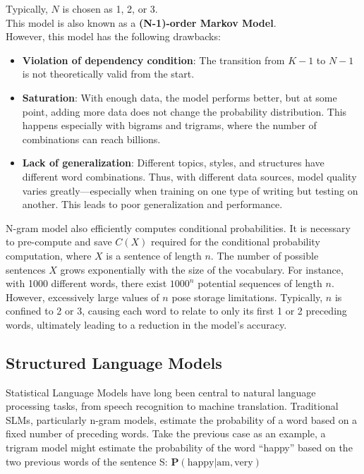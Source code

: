 Typically, $N$ is chosen as 1, 2, or 3.\\

This model is also known as a \textbf{(N-1)-order Markov Model}.\\

However, this model has the following drawbacks:

\begin{itemize}
    \item \textbf{Violation of dependency condition}: The transition from $K - 1$ to $N - 1$ is not theoretically valid from the start.
    \item \textbf{Saturation}: With enough data, the model performs better, but at some point, adding more data does not change the probability distribution. This happens especially with bigrams and trigrams, where the number of combinations can reach billions.
    \item \textbf{Lack of generalization}: Different topics, styles, and structures have different word combinations. Thus, with different data sources, model quality varies greatly—especially when training on one type of writing but testing on another. This leads to poor generalization and performance.
\end{itemize}

N-gram model also efficiently computes conditional probabilities. It is necessary to pre-compute and save $C(X)$ required for the conditional probability computation, where $X$ is a sentence of length $n$. The number of possible sentences $X$ grows exponentially with the size of the vocabulary. For instance, with 1000 different words, there exist $1000^n$ potential sequences of length $n$. However, excessively large values of $n$ pose storage limitations. Typically, $n$ is confined to 2 or 3, causing each word to relate to only its first 1 or 2 preceding words, ultimately leading to a reduction in the model’s accuracy.

\subsection{Structured Language Models}

Statistical Language Models have long been central to natural language processing tasks, from speech recognition to machine translation. Traditional SLMs, particularly n-gram models, estimate the probability of a word based on a fixed number of preceding words. Take the previous case as an example, a trigram model might estimate the probability of the word “happy” based on the two previous words of the sentence S: $\mathbf{P}(\text{happy} | \text{am},\text{very})$

